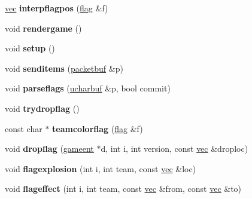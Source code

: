 \begin{DoxyCompactItemize}
\hyperlink{structvec}{vec} {\bfseries interpflagpos} (\hyperlink{structgame_1_1ctfclientmode_1_1flag}{flag} \&f)
\item 
\mbox{\label{structgame_1_1ctfclientmode_a158bed55d1473892760d4d3291665540}} 
void {\bfseries rendergame} ()
\item 
\mbox{\label{structgame_1_1ctfclientmode_aa372ee6729a5ff42d537cc874d8a0484}} 
void {\bfseries setup} ()
\item 
\mbox{\label{structgame_1_1ctfclientmode_ad347924d3b4aa89b1a8b2cfb571e2bdd}} 
void {\bfseries senditems} (\hyperlink{structpacketbuf}{packetbuf} \&p)
\item 
\mbox{\label{structgame_1_1ctfclientmode_a237724921c8d0a5898d756df83929af7}} 
void {\bfseries parseflags} (\hyperlink{structdatabuf}{ucharbuf} \&p, bool commit)
\item 
\mbox{\label{structgame_1_1ctfclientmode_a2b46979f6ef3167fc76612025c340c97}} 
void {\bfseries trydropflag} ()
\item 
\mbox{\label{structgame_1_1ctfclientmode_a408b9f33dafea70d68aee715b95989ec}} 
const char $\ast$ {\bfseries teamcolorflag} (\hyperlink{structgame_1_1ctfclientmode_1_1flag}{flag} \&f)
\item 
\mbox{\label{structgame_1_1ctfclientmode_aadf112039a6dfe53727a4257626ec891}} 
void {\bfseries dropflag} (\hyperlink{structgameent}{gameent} $\ast$d, int i, int version, const \hyperlink{structvec}{vec} \&droploc)
\item 
\mbox{\label{structgame_1_1ctfclientmode_abbde5fc6cc2e13b6275a0e35e63e7e7e}} 
void {\bfseries flagexplosion} (int i, int team, const \hyperlink{structvec}{vec} \&loc)
\item 
\mbox{\label{structgame_1_1ctfclientmode_a8e29e3638b16a47f6dfd51db915867f1}} 
void {\bfseries flageffect} (int i, int team, const \hyperlink{structvec}{vec} \&from, const \hyperlink{structvec}{vec} \&to)

\end{DoxyCompactItemize}
